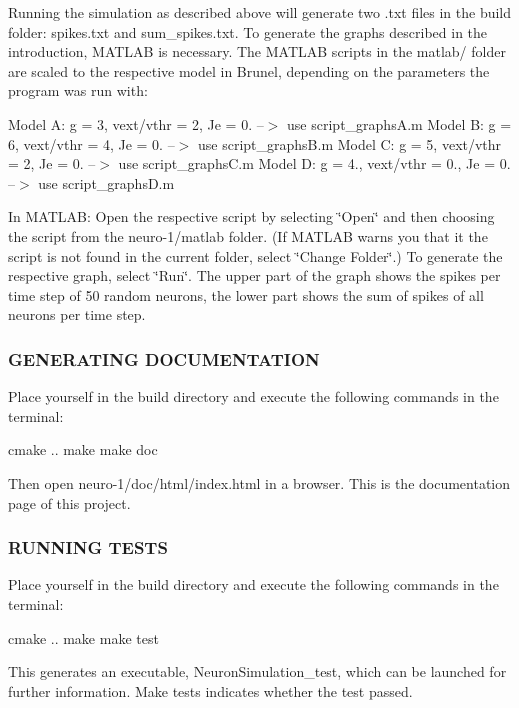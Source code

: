 Running the simulation as described above will generate two .txt files in the build folder\+: spikes.\+txt and sum\+\_\+spikes.\+txt. To generate the graphs described in the introduction, M\+A\+T\+L\+AB is necessary. The M\+A\+T\+L\+AB scripts in the matlab/ folder are scaled to the respective model in Brunel, depending on the parameters the program was run with\+:

Model A\+: g = 3, vext/vthr = 2, Je = 0. --$>$ use script\+\_\+graphs\+A.\+m Model B\+: g = 6, vext/vthr = 4, Je = 0. --$>$ use script\+\_\+graphs\+B.\+m Model C\+: g = 5, vext/vthr = 2, Je = 0. --$>$ use script\+\_\+graphs\+C.\+m Model D\+: g = 4., vext/vthr = 0., Je = 0. --$>$ use script\+\_\+graphs\+D.\+m

In M\+A\+T\+L\+AB\+: Open the respective script by selecting \char`\"{}\+Open\char`\"{} and then choosing the script from the neuro-\/1/matlab folder. (If M\+A\+T\+L\+AB warns you that it the script is not found in the current folder, select \char`\"{}\+Change Folder\char`\"{}.) To generate the respective graph, select \char`\"{}\+Run\char`\"{}. The upper part of the graph shows the spikes per time step of 50 random neurons, the lower part shows the sum of spikes of all neurons per time step.

\subsubsection*{G\+E\+N\+E\+R\+A\+T\+I\+NG D\+O\+C\+U\+M\+E\+N\+T\+A\+T\+I\+ON}

Place yourself in the build directory and execute the following commands in the terminal\+: \begin{DoxyVerb}    cmake ..
    make
    make doc
\end{DoxyVerb}


Then open neuro-\/1/doc/html/index.\+html in a browser. This is the documentation page of this project.

\subsubsection*{R\+U\+N\+N\+I\+NG T\+E\+S\+TS}

Place yourself in the build directory and execute the following commands in the terminal\+: \begin{DoxyVerb}    cmake ..
    make
    make test
\end{DoxyVerb}


This generates an executable, Neuron\+Simulation\+\_\+test, which can be launched for further information. Make tests indicates whether the test passed.

